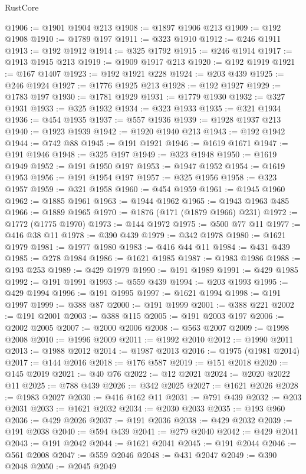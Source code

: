 \begin{lexlean}{RustCore}
\begin{coremodule}
@1906 := @1901 @1904 @213
@1908 := @1897 @1906 @213
@1909 := @192 @1908
@1910 := @1789 @197
@1911 := @323 @1910
@1912 := @246 @1911
@1913 := @192 @1912
@1914 := @325 @1792
@1915 := @246 @1914
@1917 := @1913 @1915 @213
@1919 := @1909 @1917 @213
@1920 := @192 @1919
@1921 := @167 @1407
@1923 := @192 @1921 @228
@1924 := @203 @439
@1925 := @246 @1924
@1927 := @1776 @1925 @213
@1928 := @192 @1927
@1929 := @1783 @197
@1930 := @1781 @1929
@1931 := @1779 @1930
@1932 := @327 @1931
@1933 := @325 @1932
@1934 := @323 @1933
@1935 := @321 @1934
@1936 := @454 @1935
@1937 := @557 @1936
@1939 := @1928 @1937 @213
@1940 := @1923 @1939
@1942 := @1920 @1940 @213
@1943 := @192 @1942
@1944 := @742 @88
@1945 := @191 @1921
@1946 := @1619 @1671
@1947 := @191 @1946
@1948 := @325 @197
@1949 := @323 @1948
@1950 := @1619 @1949
@1952 := @191 @1950 @197
@1953 := @1947 @1952
@1954 := @1619 @1953
@1956 := @191 @1954 @197
@1957 := @325 @1956
@1958 := @323 @1957
@1959 := @321 @1958
@1960 := @454 @1959
@1961 := @1945 @1960
@1962 := @1885 @1961
@1963 := @1944 @1962
@1965 := @1943 @1963 @485
@1966 := @1889 @1965
@1970 := @1876 (@171 (@1879 @1966) @231)
@1972 := @1772 (@1775 @1970)
@1973 := @144 @1972
@1975 := @500 @77 @11
@1977 := @416 @38 @11
@1978 := @390 @439
@1979 := @342 @1978
@1980 := @1621 @1979
@1981 := @1977 @1980
@1983 := @416 @44 @11
@1984 := @431 @439
@1985 := @278 @1984
@1986 := @1621 @1985
@1987 := @1983 @1986
@1988 := @193 @253
@1989 := @429 @1979
@1990 := @191 @1989
@1991 := @429 @1985
@1992 := @191 @1991
@1993 := @559 @439
@1994 := @203 @1993
@1995 := @429 @1994
@1996 := @191 @1995
@1997 := @1621 @1994
@1998 := @191 @1997
@1999 := @388 @87
@2000 := @191 @1999
@2001 := @388 @221
@2002 := @191 @2001
@2003 := @388 @115
@2005 := @191 @2003 @197
@2006 := @2002 @2005
@2007 := @2000 @2006
@2008 := @563 @2007
@2009 := @1998 @2008
@2010 := @1996 @2009
@2011 := @1992 @2010
@2012 := @1990 @2011
@2013 := @1988 @2012
@2014 := @1987 @2013
@2016 := @1975 (@1981 @2014)
@2017 := @144 @2016
@2018 := @176 @587
@2019 := @151 @2018
@2020 := @145 @2019
@2021 := @40 @76
@2022 := @12 @2021
@2024 := @2020 @2022 @11
@2025 := @788 @439
@2026 := @342 @2025
@2027 := @1621 @2026
@2028 := @1983 @2027
@2030 := @416 @162 @11
@2031 := @791 @439
@2032 := @203 @2031
@2033 := @1621 @2032
@2034 := @2030 @2033
@2035 := @193 @960
@2036 := @429 @2026
@2037 := @191 @2036
@2038 := @429 @2032
@2039 := @191 @2038
@2040 := @594 @439
@2041 := @279 @2040
@2042 := @429 @2041
@2043 := @191 @2042
@2044 := @1621 @2041
@2045 := @191 @2044
@2046 := @561 @2008
@2047 := @559 @2046
@2048 := @431 @2047
@2049 := @390 @2048
@2050 := @2045 @2049

\end{coremodule}
\end{lexlean}
